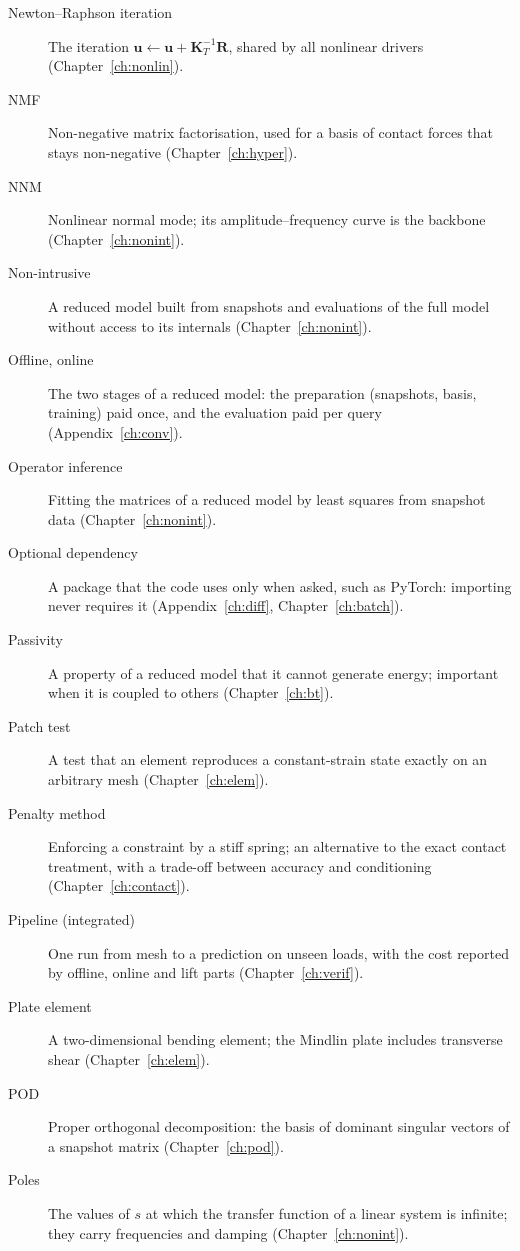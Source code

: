 \begin{description}
\item[Newton--Raphson iteration] The iteration $\bm u\leftarrow\bm u+\bm K_T^{-1}\bm R$, shared by all nonlinear drivers (Chapter~\ref{ch:nonlin}).
\item[NMF] Non-negative matrix factorisation, used for a basis of contact forces that stays non-negative (Chapter~\ref{ch:hyper}).
\item[NNM] Nonlinear normal mode; its amplitude--frequency curve is the backbone (Chapter~\ref{ch:nonint}).
\item[Non-intrusive] A reduced model built from snapshots and evaluations of the full model without access to its internals (Chapter~\ref{ch:nonint}).
\item[Offline, online] The two stages of a reduced model: the preparation (snapshots, basis, training) paid once, and the evaluation paid per query (Appendix~\ref{ch:conv}).
\item[Operator inference] Fitting the matrices of a reduced model by least squares from snapshot data (Chapter~\ref{ch:nonint}).
\item[Optional dependency] A package that the code uses only when asked, such as PyTorch: importing never requires it (Appendix~\ref{ch:diff}, Chapter~\ref{ch:batch}).
\item[Passivity] A property of a reduced model that it cannot generate energy; important when it is coupled to others (Chapter~\ref{ch:bt}).
\item[Patch test] A test that an element reproduces a constant-strain state exactly on an arbitrary mesh (Chapter~\ref{ch:elem}).
\item[Penalty method] Enforcing a constraint by a stiff spring; an alternative to the exact contact treatment, with a trade-off between accuracy and conditioning (Chapter~\ref{ch:contact}).
\item[Pipeline (integrated)] One run from mesh to a prediction on unseen loads, with the cost reported by offline, online and lift parts (Chapter~\ref{ch:verif}).
\item[Plate element] A two-dimensional bending element; the Mindlin plate includes transverse shear (Chapter~\ref{ch:elem}).
\item[POD] Proper orthogonal decomposition: the basis of dominant singular vectors of a snapshot matrix (Chapter~\ref{ch:pod}).
\item[Poles] The values of $s$ at which the transfer function of a linear system is infinite; they carry frequencies and damping (Chapter~\ref{ch:nonint}).

\end{description}
